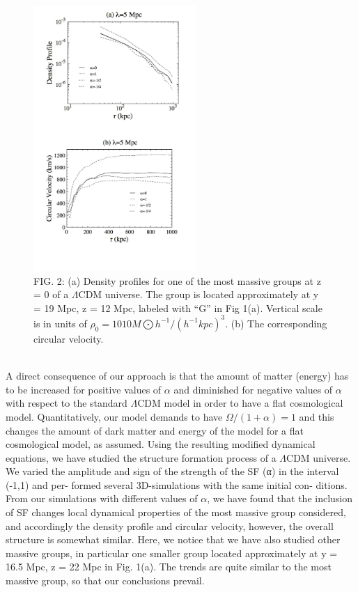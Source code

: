 \documentclass[10pt,twocolumn]{article}
\begin{document}
\begin{figure}[h]
\centering
\raggedleft
\includegraphics[width=0.55\textwidth]{imagenarticulo2.png}
\caption{FIG. 2: (a) Density proﬁles for one of the most massive groups at z = 0 of a $\Lambda$CDM universe. The group is located approximately at y = 19 Mpc, z = 12 Mpc, labeled with “G” in Fig 1(a). Vertical scale is in units of $\rho_{0} = 1010M \bigodot h^{−1}/(h^{−1}kpc)^{3}.$ (b) The corresponding circular velocity.}
\label{fig}
\end{figure}
\\
A direct consequence of our approach is that the amount of matter (energy) has to be increased for positive values of $\alpha$ and diminished for negative values of $\alpha$ with respect to the standard $\Lambda$CDM model in order to have a ﬂat cosmological model. Quantitatively, our model demands to have $\Omega/(1 + \alpha) = 1$ and this changes the amount of dark matter and energy of the model for a ﬂat cosmological model, as assumed.
Using the resulting modiﬁed dynamical equations, we have studied the structure formation process of a $\Lambda$CDM universe. We varied the amplitude and sign of the strength of the SF (α) in the interval (-1,1) and per- formed several 3D-simulations with the same initial con- ditions. From our simulations with diﬀerent values of $\alpha$, we have found that the inclusion of SF changes local dynamical properties of the most massive group considered, and accordingly the density proﬁle and circular velocity, however, the overall structure is somewhat similar. Here, we notice that we have also studied other massive groups, in particular one smaller group located approximately at y = 16.5 Mpc, z = 22 Mpc in Fig. 1(a). The trends are quite similar to the most massive group, so that our conclusions prevail.
\end{document}

